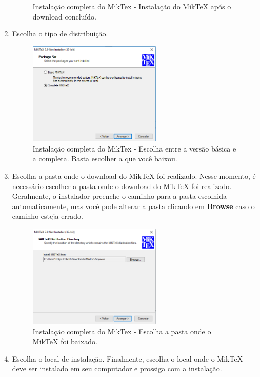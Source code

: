 \begin{enumerate}
\begin{figure}[H]
  \caption{Instalação completa do MikTex - Instalação do MikTeX após o download concluído.}
\end{figure}
\item Escolha o tipo de distribuição.
\begin{figure}[H]
  \centering
  \includegraphics[width=0.6\textwidth]{./fig/miktex18}
  \caption{Instalação completa do MikTex - Escolha entre a versão básica e a completa. Basta escolher a que você baixou.}
\end{figure}
\item Escolha a pasta onde o download do MikTeX foi realizado.
Nesse momento, é necessário escolher a pasta onde o download do MikTeX foi realizado. Geralmente, o instalador preenche o caminho para a pasta escolhida automaticamente, mas você pode alterar a pasta clicando em \textbf{Browse} caso o caminho esteja errado.
\begin{figure}[H]
  \centering
  \includegraphics[width=0.6\textwidth]{./fig/miktex19}
  \caption{Instalação completa do MikTex - Escolha a pasta onde o MikTeX foi baixado.}
\end{figure}
\item Escolha o local de instalação.
Finalmente, escolha o local onde o MikTeX deve ser instalado em seu computador e prossiga com a instalação. 

\end{enumerate}
